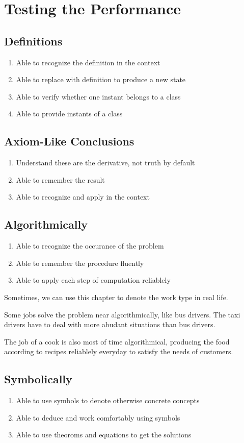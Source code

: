 \section{Testing the Performance}

\subsection*{Definitions}

\begin{enumerate}
  \item Able to recognize the definition in the context
  \item Able to replace with definition to produce a new state
  \item Able to verify whether one instant belongs to a class
  \item Able to provide instants of a class
\end{enumerate}

\subsection*{Axiom-Like Conclusions}
\begin{enumerate}
  \item Understand these are the derivative, not truth by default
  \item Able to remember the result
  \item Able to recognize and apply in the context
\end{enumerate}

\subsection*{Algorithmically}

\begin{enumerate}
  \item Able to recognize the occurance of the problem
  \item Able to remember the procedure fluently
  \item Able to apply each step of computation reliablely
\end{enumerate}

Sometimes, we can use this chapter to denote the work type in real life.

Some jobs solve the problem near algorithmically, like bus drivers. The taxi drivers have to deal with more abudant situations than bus drivers.

The job of a cook is also most of time algorithmical, producing the food according to recipes reliablely everyday to satisfy the needs of customers.

\subsection*{Symbolically}

\begin{enumerate}
  \item Able to use symbols to denote otherwise concrete concepts
  \item Able to deduce and work comfortably using symbols
  \item Able to use theoroms and equations to get the solutions
\end{enumerate}
